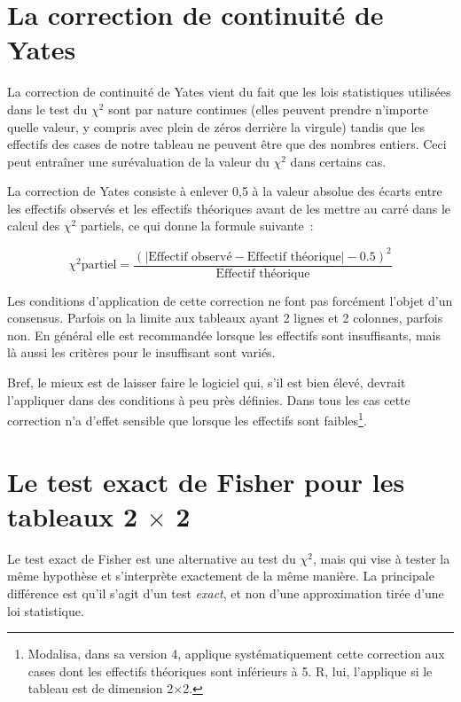 \documentclass[a4paper,10pt,twoside,francais]{report}
\newcommand{\chid}{$\chi^2$\xspace}
\begin{document}
\section{La correction de continuité de Yates}

La correction de continuité de Yates vient du fait que les lois
statistiques utilisées dans le test du \chid sont par nature continues
(elles peuvent prendre n'importe quelle valeur, y compris avec plein
de zéros derrière la virgule) tandis que les effectifs des cases de
notre tableau ne peuvent être que des nombres entiers. Ceci peut
entraîner une surévaluation de la valeur du \chid dans certains cas.

La correction de Yates consiste à enlever 0,5 à la valeur absolue des
écarts entre les effectifs observés et les effectifs théoriques avant
de les mettre au carré dans le calcul des \chid partiels, ce qui donne
la formule suivante~:

$$\chi^2 \text{partiel} = \frac{ (| \text{Effectif observé} - \text{Effectif théorique} | - 0.5)^2}{\text{Effectif théorique}}$$


Les conditions d'application de cette correction ne font pas forcément
l'objet d'un consensus. Parfois on la limite aux tableaux ayant 2
lignes et 2 colonnes, parfois non. En général elle est recommandée
lorsque les effectifs sont insuffisants, mais là aussi les critères
pour le \og insuffisant \fg{} sont variés.

Bref, le mieux est de laisser faire le logiciel qui, s'il est bien
élevé, devrait l'appliquer dans des conditions à peu près
définies. Dans tous les cas cette correction n'a d'effet sensible que
lorsque les effectifs sont faibles\footnote{\textsf{Modalisa}, dans sa
  version 4, applique systématiquement cette correction aux cases dont
  les effectifs théoriques sont inférieurs à 5. \textsf{R}, lui,
  l'applique si le tableau est de dimension 2$\times$2.}.


\section{Le test exact de Fisher pour les tableaux  2
  \texorpdfstring{$\times$}{x} 2}
\label{ssec-testfisher}

Le test exact de Fisher est une alternative au test du \chid, mais qui
vise à tester la même hypothèse et s'interprète exactement de la même
manière. La principale différence est qu'il s'agit d'un test
\textit{exact}, et non d'une approximation tirée d'une loi
statistique.
\end{document}
